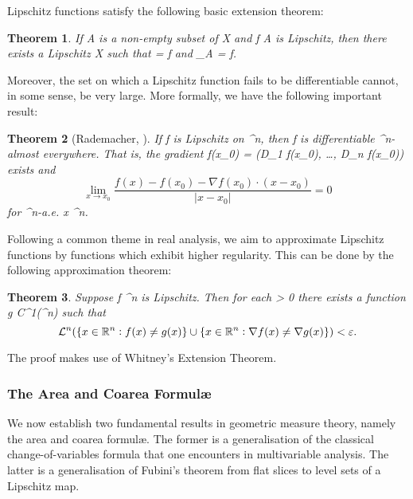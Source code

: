 \documentclass[a4paper, 11pt]{article}
\theoremstyle{plain}
\newtheorem{theorem}{Theorem}[section]
\theoremstyle{definition}
\theoremstyle{remark}
\DeclareMathOperator{\lip}{Lip}
\numberwithin{equation}{subsection}
\def\({}
\def\){}
\begin{document}
Lipschitz functions satisfy the following basic extension theorem:

\begin{theorem}
\label{Lipschitz_Extension_Theorem}
If \(A\) is a non-empty subset of \(X\) and \(f \vcentcolon A \rightarrow {}\) is Lipschitz, then there exists a Lipschitz \( \vcentcolon X \rightarrow {}\) such that \(\lip {} = \lip f\) and \(\vert_A = f\).
\end{theorem}

Moreover, the set on which a Lipschitz function fails to be differentiable cannot, in some sense, be very large. More formally, we have the following important result:

\begin{theorem}[{Rademacher, \cite[Section 2.1]{Sim18}}]
If \(f\) is Lipschitz on \(^n\), then \(f\) is differentiable \(^n\)-almost everywhere. That is, the gradient \(\nabla f(x_0) = (D_1 f(x_0), \ldots, D_n f(x_0))\) exists and
\begin{equation}
\lim_{x \rightarrow x_0} \frac{f(x) - f(x_0) - \nabla f(x_0) \cdot (x-x_0)}{|x-x_0|} = 0
\end{equation}
for \(^n\)-a.e. \(x \in {}^n\).
\end{theorem}

Following a common theme in real analysis, we aim to approximate Lipschitz functions by functions which exhibit higher regularity. This can be done by the following approximation theorem:


\begin{theorem}
Suppose \(f \vcentcolon {}^n \rightarrow {}\) is Lipschitz. Then for each \(\varepsilon > 0\) there exists a function \(g \in C^1(^n)\) such that
\begin{equation}
\mathcal{L}^n(\{x \in \mathbb{R}^n \vcentcolon f(x) \neq g(x)\} \cup \{x \in \mathbb{R}^n \vcentcolon \nabla f(x) \neq \nabla g(x)\}) < \varepsilon.
\end{equation}
\end{theorem}

The proof makes use of Whitney's Extension Theorem.

\subsubsection{The Area and Coarea Formul\ae}

We now establish two fundamental results in geometric measure theory, namely the area and coarea formul\ae. The former is a generalisation of the classical change-of-variables formula that one encounters in multivariable analysis. The latter is a generalisation of Fubini's theorem from flat slices to level sets of a Lipschitz map.
\end{document}
